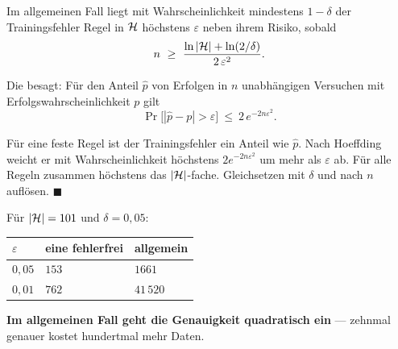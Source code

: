 \begin{merksatz}
Im allgemeinen Fall liegt mit Wahrscheinlichkeit mindestens $1-\delta$ der Trainingsfehler  Regel in $\mathcal{H}$ höchstens $\varepsilon$ neben ihrem Risiko, sobald
\[ n \ \ge\ \frac{\ln|\Hyp| + \ln(2/\delta)}{2\,\varepsilon^{2}} . \]

Die  besagt: Für den Anteil $\hat p$ von Erfolgen in $n$ unabhängigen Versuchen mit Erfolgswahrscheinlichkeit $p$ gilt
\[ \Pr\bigl[|\hat p - p| > \varepsilon\bigr] \ \le\ 2\,e^{-2n\varepsilon^{2}} . \]

\begin{center}
\begin{minipage}{0.88\textwidth}
\end{minipage}
\end{center}

Für eine feste Regel ist der Trainingsfehler ein Anteil wie $\hat p$. Nach Hoeffding weicht er mit Wahrscheinlichkeit höchstens $2e^{-2n\varepsilon^{2}}$ um mehr als $\varepsilon$ ab. Für alle Regeln zusammen höchstens das $|\mathcal{H}|$-fache. Gleichsetzen mit $\delta$ und nach $n$ auflösen. $\blacksquare$

Für $|\mathcal{H}| = 101$ und $\delta = 0{,}05$:
\begin{center}
{\small
\renewcommand{\arraystretch}{1.5}
\begin{tabular}{@{}P{1.6cm}P{2.8cm}P{2.8cm}@{}}
\toprule
$\varepsilon$ & \textbf{eine fehlerfrei} & \textbf{allgemein}\\
\midrule
$0{,}05$ & $153$ & $1661$\\
$0{,}01$ & $762$ & $41\,520$\\
\bottomrule
\end{tabular}}
\end{center}

\begin{center}
\begin{minipage}{0.9\textwidth}
\textbf{Im allgemeinen Fall geht die Genauigkeit quadratisch ein} --- zehnmal genauer kostet hundertmal mehr Daten.
\end{minipage}
\end{center}


\end{merksatz}

